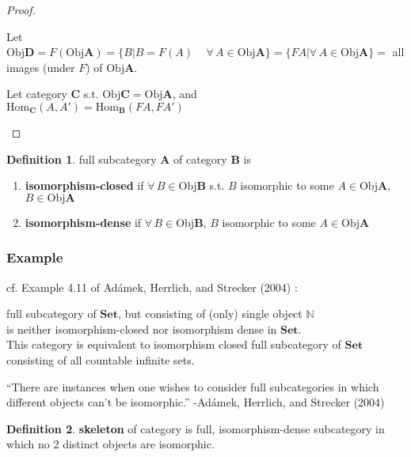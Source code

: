 \documentclass[twoside,landscape,10pt]{amsart}
\theoremstyle{plain}
\theoremstyle{definition}
\newtheorem{definition}{Definition}
\theoremstyle{remark}
\begin{document}
\begin{multicols*}{2}
\begin{proof}
\begin{enumerate}
Let $\text{Obj}\mathbf{D} = F(\text{Obj}\mathbf{A}) = \lbrace B | B = F(A) \quad \, \forall \, A \in \text{Obj}\mathbf{A} \rbrace = \lbrace FA | \forall \, A \in \text{Obj}\mathbf{A} \rbrace = $ all images (under $F$) of $\text{Obj}\mathbf{A}$.  

Let category $\mathbf{C}$ s.t. $\text{Obj}\mathbf{C} = \text{Obj}\mathbf{A}$, and \\
 $\text{Hom}_{\mathbf{C}}(A,A') = \text{Hom}_{\mathbf{B}}(FA,FA')$
\end{enumerate}
\end{proof}


\begin{definition}
  full subcategory $\mathbf{A}$ of category $\mathbf{B}$ is 
\begin{enumerate}
  \item \textbf{isomorphism-closed} if $\forall \, B \in \text{Obj}\mathbf{B}$ s.t. $B$ isomorphic to some $A \in \text{Obj}\mathbf{A}$, $B\in \text{Obj}\mathbf{A}$ 
  \item \textbf{isomorphism-dense} if $\forall \, B \in \text{Obj}\mathbf{B}$, $B$ isomorphic to some $A\in \text{Obj}\mathbf{A}$
\end{enumerate}
\end{definition}

\subsubsection{Example} cf. Example 4.11 of Ad\'{a}mek, Herrlich, and Strecker (2004) \cite{AHS2004}:

full subcategory of $\mathbf{\text{Set}}$, but consisting of (only) single object $\mathbb{N}$ \\
\phantom{ \quad \, } is neither isomorphism-closed nor isomorphism dense in $\mathbf{\text{Set}}$.  \\
\phantom{ \quad \quad \, } This category is equivalent to isomorphism closed full subcategory of $\mathbf{\text{Set}}$ consisting of all countable infinite sets.  

``There are instances when one wishes to consider full subcategories in which different objects can't be isomorphic.'' -Ad\'{a}mek, Herrlich, and Strecker (2004) \cite{AHS2004}

\begin{definition}
  \textbf{skeleton} of category is full, isomorphism-dense subcategory in which no 2 distinct objects are isomorphic.  
\end{definition}


\end{multicols*}
\end{document}
